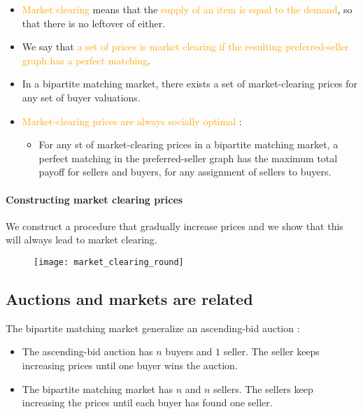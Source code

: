 \begin{itemize}
\item \textcolor{orange}{Market clearing} means that the \textcolor{orange}{supply of an item is equal to the demand}, so that there is no leftover of either.
\item We say that \textcolor{orange}{a set of prices is market clearing if the resulting preferred-seller graph has a perfect matching}.
\item In a bipartite matching market, there exists a set of market-clearing prices for any set of buyer valuations.
\item \textcolor{orange}{Market-clearing prices are always socially optimal} :
	\begin{itemize}
	\item For any st of market-clearing prices in a bipartite matching market, a perfect matching in the preferred-seller graph has the maximum total payoff for sellers and buyers, for any assignment of sellers to buyers.
	\end{itemize}
\end{itemize}

\paragraph{Constructing market clearing prices}

We construct a procedure that gradually increase prices and we show that this will always lead to market clearing.

\begin{figure}[H]
    \centering
    \texttt{[image: market\_clearing\_round]}
\end{figure}

\subsection{Auctions and markets are related}

The bipartite matching market generalize an ascending-bid auction :
\begin{itemize}
\item The ascending-bid auction has $n$ buyers and $1$ seller. The seller keeps increasing prices until one buyer wins the auction.
\item The bipartite matching market has $n$ and $n$ sellers. The sellers keep increasing the prices until each buyer has found one seller.
\end{itemize}


